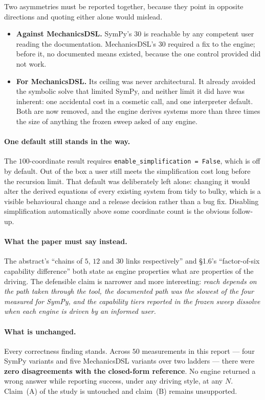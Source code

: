 \documentclass[11pt,a4paper]{article}
\newcommand{\code}[1]{\texttt{\small #1}}
\begin{document}
Two asymmetries must be reported together, because they point in opposite
directions and quoting either alone would mislead.

\begin{itemize}[leftmargin=1.4em,itemsep=0.3em]
  \item \textbf{Against MechanicsDSL.} SymPy's $30$ is reachable by any
        competent user reading the documentation. MechanicsDSL's $30$ required
        a fix to the engine; before it, no documented means existed, because the
        one control provided did not work.
  \item \textbf{For MechanicsDSL.} Its ceiling was never architectural.
        It already avoided the symbolic solve that limited SymPy, and neither
        limit it did have was inherent: one accidental cost in a cosmetic
        call, and one interpreter default. Both are now removed, and the
        engine derives systems more than three times the size of anything the
        frozen sweep asked of any engine.
\end{itemize}

\paragraph{One default still stands in the way.}
The $100$-coordinate result requires \code{enable\_simplification = False},
which is off by default. Out of the box a user still meets the simplification
cost long before the recursion limit. That default was deliberately left alone:
changing it would alter the derived equations of every existing system from tidy
to bulky, which is a visible behavioural change and a release decision rather
than a bug fix. Disabling simplification automatically above some coordinate
count is the obvious follow-up.

\paragraph{What the paper must say instead.}
The abstract's ``chains of $5$, $12$ and $30$ links respectively'' and
\S1.6's ``factor-of-six capability difference'' both state as engine properties
what are properties of the driving. The defensible claim is narrower and more
interesting: \emph{reach depends on the path taken through the tool, the
documented path was the slowest of the four measured for SymPy, and the
capability tiers reported in the frozen sweep dissolve when each engine is
driven by an informed user.}

\paragraph{What is unchanged.}
Every correctness finding stands. Across $50$ measurements in this report ---
four SymPy variants and five MechanicsDSL variants over two ladders --- there
were \textbf{zero disagreements with the closed-form reference}. No engine
returned a wrong answer while reporting success, under any driving style, at any
$N$. Claim~(A) of the study is untouched and claim~(B) remains unsupported.
\end{document}
